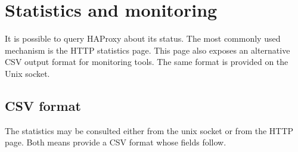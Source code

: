 \chapter{Statistics and monitoring}

It is possible to query HAProxy about its status. The most commonly used
mechanism is the HTTP statistics page. This page also exposes an alternative
CSV output format for monitoring tools. The same format is provided on the
Unix socket.

\section{CSV format}

The statistics may be consulted either from the unix socket or from the HTTP
page. Both means provide a CSV format whose fields follow.

